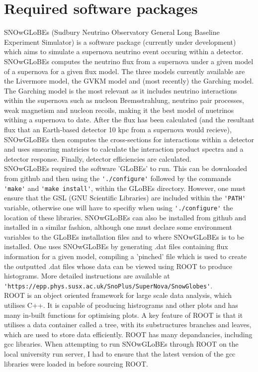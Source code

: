 \documentclass[a4paper,12,oneside,notitlepage]{report}
\begin{document}
\section*{\fontsize{11}{11}\selectfont Required software packages}
SNOwGLoBEs (Sudbury Neutrino Observatory General Long Baseline Experiment Simulator) is a software package (currently under development) which aims to simulate a supernova neutrino event occuring within a detector. SNOwGLoBEs computes the neutrino flux from a supernova under a given model of a supernova for a given flux model. The three models currently available are the Livermore model, the GVKM model and (most recently) the Garching model. The Garching model is the most relevant as it includes neutrino interactions within the supernova such as nucleon Bremsstrahlung, neutrino pair processes, weak magnetism and nucleon recoils, making it the best model of nuetrinos withing a supernova to date. After the flux has been calculated (and the resultant flux that an Earth-based detector 10 kpc from a supernova would recieve), SNOwGLoBEs then computes the cross-sections for interactions within a detector and uses smearing matricies to calculate the interaction product spectra and a detector response. Finally, detector efficiencies are calculated. 
\vspace{0.5cm}
\\SNOwGLoBEs required the software 'GLoBEs' to run. This can be downloaded from github and then using the \verb|'./configure'| followed by the commands \verb|'make'| and \verb|'make install'|, within the GLoBEs directory. However, one must ensure that the GSL (GNU Scientific Libraries) are included within the \verb|'PATH'| variable, otherwise one will have to specifiy when using \verb|'./configure'| the location of these libraries. SNOwGLoBEs can also be installed from github and installed in a similar fashion, although one must declare some environment variables to the GLoBEs installation files and to where SNOwGLoBEs is to be installed. One uses SNOwGLoBEs by generating .dat files containing flux information for a given model, compiling a 'pinched' file which is used to create the outputted .dat files whose data can be viewed using ROOT to produce histograms. More detailed instructions are available at \verb|'https://epp.phys.susx.ac.uk/SnoPlus/SuperNova/SnowGlobes'|.
\vspace{0.5cm}
\\ROOT is an object oriented framework for large scale data analysis, which utilises C++. It is capable of producing histrograms and other plots and has many in-built functions for optimising plots. A key feature of ROOT is that it utilises a data container called a tree, with its substructures branches and leaves, which are used to store data efficiently. ROOT has many depandancies, including gcc libraries. When attempting to run SNOwGLoBEs through ROOT on the local university run server, I had to ensure that the latest version of the gcc libraries were loaded in before sourcing ROOT.
\end{document}
